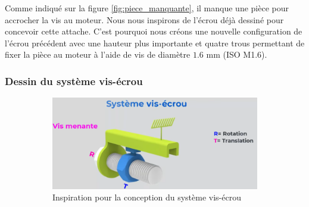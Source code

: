 \documentclass[a4paper, 11pt]{report}
\begin{document}
            Comme indiqué sur la figure \ref{fig:piece_manquante}, il manque une pièce pour accrocher la vis au moteur. Nous nous inspirons de l'écrou déjà dessiné pour concevoir cette attache. C'est pourquoi nous créons une nouvelle configuration de l'écrou précédent avec une hauteur plus importante et quatre trous permettant de fixer la pièce au moteur à l'aide de vis de diamètre $1.6$ mm (ISO M1.6).

        \subsubsection{Dessin du système vis-écrou}

            \begin{figure}
                \centering
                \begin{subfigure}[t]{0.5\textwidth}
                    \centering
                    \includegraphics[width=\textwidth]{Figures/système vis écrou.png}
                    \caption{Inspiration pour la conception du système vis-écrou \cite{w3d_tech_systeme_2023}}
                    \label{fig:vis_ecrou}
                \end{subfigure}
                \hfill
                \begin{subfigure}[t]{0.2\textwidth}
                    \centering

\end{subfigure}
\end{figure}
\end{document}
